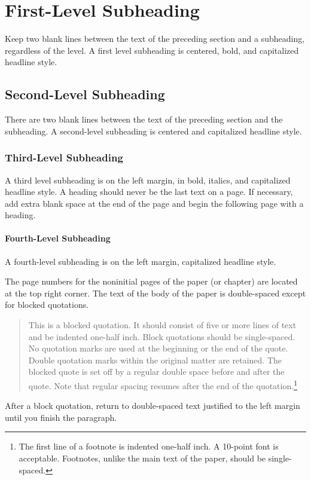 \documentclass{sblreport}
\begin{document}
\section[First-level subheading (indent three spaces, no dots); titles that
exceed one line must also be indented for subsequent lines]{First-Level
Subheading}

Keep two blank lines between the text of the preceding section and a
subheading, regardless of the level. A first level subheading is centered,
bold, and capitalized headline style.

\subsection[Second-level subheadings (indent three spaces, no
dots)]{Second-Level Subheading}

There are two blank lines between the text of the preceding section and the
subheading. A second-level subheading is centered and capitalized headline
style.

\subsubsection{Third-Level Subheading}

A third level subheading is on the left margin, in bold, italics, and
capitalized headline style. A heading should never be the last text on a page.
If necessary, add extra blank space at the end of the page and begin the
following page with a heading.

\paragraph{Fourth-Level Subheading}

A fourth-level subheading is on the left margin, capitalized headline style.

The page numbers for the noninitial pages of the paper (or chapter) are
located at the top right corner. The text of the body of the paper is
double-spaced except for blocked
quotations.
\begin{quote}
  This is a blocked quotation. It should consist of five or more lines of text
  and be indented one-half inch. Block quotations should be single-spaced. No
  quotation marks are used at the beginning or the end of the quote. Double
  quotation marks within the original matter are retained. The blocked quote
  is set off by a regular double space before and after the quote. Note that
  regular spacing resumes after the end of the quotation.\footnote{The first
  line of a footnote is indented one-half inch. A 10-point font is acceptable.
  Footnotes, unlike the main text of the paper, should be single-spaced.}
\end{quote}
After a block quotation, return to double-spaced text justified to the left
margin until you finish the paragraph.
\end{document}
